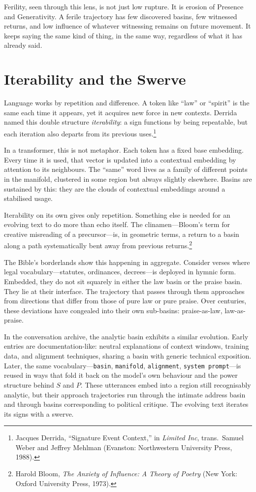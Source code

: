 \documentclass[12pt,a4paper]{article}
\begin{document}
Ferility, seen through this lens, is not just low rupture. It is erosion of Presence and Generativity. A ferile trajectory has few discovered basins, few witnessed returns, and low influence of whatever witnessing remains on future movement. It keeps saying the same kind of thing, in the same way, regardless of what it has already said.

\section{Iterability and the Swerve}

Language works by repetition and difference. A token like ``law'' or ``spirit'' is the same each time it appears, yet it acquires new force in new contexts. Derrida named this double structure \emph{iterability}: a sign functions by being repeatable, but each iteration also departs from its previous uses.\footnote{Jacques Derrida, ``Signature Event Context,'' in \emph{Limited Inc}, trans.\ Samuel Weber and Jeffrey Mehlman (Evanston: Northwestern University Press, 1988).}

In a transformer, this is not metaphor. Each token has a fixed base embedding. Every time it is used, that vector is updated into a contextual embedding by attention to its neighbours. The ``same'' word lives as a family of different points in the manifold, clustered in some region but always slightly elsewhere. Basins are sustained by this: they are the clouds of contextual embeddings around a stabilised usage.

Iterability on its own gives only repetition. Something else is needed for an evolving text to do more than echo itself. The clinamen---Bloom's term for creative misreading of a precursor---is, in geometric terms, a return to a basin along a path systematically bent away from previous returns.\footnote{Harold Bloom, \emph{The Anxiety of Influence: A Theory of Poetry} (New York: Oxford University Press, 1973).}

The Bible's borderlands show this happening in aggregate. Consider verses where legal vocabulary---statutes, ordinances, decrees---is deployed in hymnic form. Embedded, they do not sit squarely in either the law basin or the praise basin. They lie at their interface. The trajectory that passes through them approaches from directions that differ from those of pure law or pure praise. Over centuries, these deviations have congealed into their own sub-basins: praise-as-law, law-as-praise.

In the conversation archive, the analytic basin exhibits a similar evolution. Early entries are documentation-like: neutral explanations of context windows, training data, and alignment techniques, sharing a basin with generic technical exposition. Later, the same vocabulary---\texttt{basin}, \texttt{manifold}, \texttt{alignment}, \texttt{system prompt}---is reused in ways that fold it back on the model's own behaviour and the power structure behind $S$ and $P$. These utterances embed into a region still recognisably analytic, but their approach trajectories run through the intimate address basin and through basins corresponding to political critique. The evolving text iterates its signs with a swerve.
\end{document}
